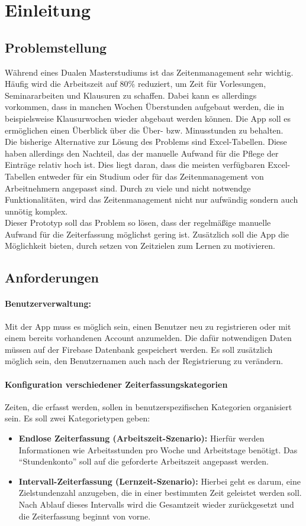 \section{Einleitung}\label{sec:einleitung}
\subsection{Problemstellung}
Während eines Dualen Masterstudiums ist das Zeitenmanagement sehr wichtig. Häufig wird die
Arbeitszeit auf 80\% reduziert, um Zeit für Vorlesungen, Seminararbeiten und Klausuren zu schaffen.
Dabei kann es allerdings vorkommen, dass in manchen Wochen Überstunden aufgebaut werden, die in beispielsweise
Klausurwochen wieder abgebaut werden können. Die App soll es ermöglichen einen Überblick über die
Über- bzw. Minusstunden zu behalten.\\
Die bisherige Alternative zur Lösung des Problems sind Excel-Tabellen.
Diese haben allerdings den Nachteil, das der manuelle Aufwand für die Pflege der Einträge relativ hoch ist.
Dies liegt daran, dass die meisten verfügbaren Excel-Tabellen entweder für ein Studium oder für
das Zeitenmanagement von Arbeitnehmern angepasst sind. Durch zu viele und nicht notwendge Funktionalitäten,
wird das Zeitenmanagement nicht nur aufwändig sondern auch unnötig komplex.\\
Dieser Prototyp soll das Problem so lösen, dass der regelmäßige manuelle Aufwand für die Zeiterfassung
möglichst gering ist. Zusätzlich soll die App die Möglichkeit bieten,
durch setzen von Zeitzielen zum Lernen zu motivieren.

\subsection{Anforderungen}
\paragraph{Benutzerverwaltung:}
Mit der App muss es möglich sein, einen Benutzer neu zu registrieren oder mit einem bereits
vorhandenen Account anzumelden.
Die dafür notwendigen Daten müssen auf der Firebase Datenbank gespeichert werden.
Es soll zusätzlich möglich sein, den Benutzernamen auch nach der Registrierung zu verändern.
\paragraph{Konfiguration verschiedener Zeiterfassungskategorien}
Zeiten, die erfasst werden, sollen in benutzerspezifischen Kategorien organisiert sein.
Es soll zwei Kategorietypen geben:
\begin{itemize}
    \item \textbf{Endlose Zeiterfassung (Arbeitszeit-Szenario):} Hierfür werden
    Informationen wie Arbeitsstunden pro Woche und Arbeitstage benötigt.
    Das \enquote{Stundenkonto} soll auf die geforderte Arbeitszeit angepasst werden.
    \item \textbf{Intervall-Zeiterfassung (Lernzeit-Szenario):} Hierbei geht es darum, eine
    Zielstundenzahl anzugeben, die in einer bestimmten Zeit geleistet werden soll. Nach Ablauf dieses Intervalls
    wird die Gesamtzeit wieder zurückgesetzt und die Zeiterfassung beginnt von vorne.
\end{itemize}
